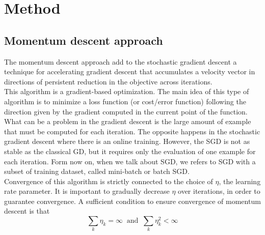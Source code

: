 \section{Method}

\subsection{Momentum descent approach}
The momentum descent approach add to the stochastic gradient descent a technique for accelerating gradient descent that accumulates a velocity vector in directions of persistent reduction in the objective across iterations. 
\\
This algorithm is a gradient-based optimization. The main idea of this type of algorithm is to minimize a loss function (or cost/error function) following the direction given by the gradient computed in the current point of the function.
\\
What can be a problem in the gradient descent is the large amount of example that must be computed for each iteration. The opposite happens in the stochastic gradient descent where there is an online training. However, the SGD is not as stable as the classical GD, but it requires only the evaluation of one example for each iteration. 
Form now on, when we talk about SGD, we refers to SGD with a subset of training dataset, called mini-batch or batch SGD.
\\
Convergence of this algorithm is strictly connected to the choice of $\eta$, the learning rate parameter. It is important to gradually decrease $\eta$ over iterations, in order to guarantee convergence. A sufficient condition to ensure convergence of momentum descent is that 
\begin{equation}
\label{assumption:momentum_descent}
\sum_k \eta_k=\infty \  \text{ and } \ \sum_k \eta_k^2 < \infty
\end{equation}

